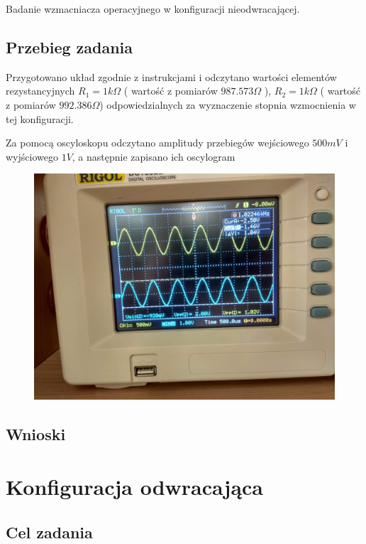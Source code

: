 \documentclass[polish,polish,a4paper]{article}
\begin{document}
\begin{spacing}{1.3}
Badanie wzmacniacza operacyjnego w konfiguracji nieodwracającej.

\subsection{Przebieg zadania}

Przygotowano układ zgodnie z instrukcjami i odczytano wartości elementów rezystancyjnych $R_{1} = 1k\Omega$ ( wartość z pomiarów $987.573\Omega$ ), $R_{2} = 1k\Omega$ ( wartość z pomiarów $992.386\Omega$)  odpowiedzialnych za wyznaczenie stopnia wzmocnienia w tej konfiguracji.

Za pomocą oscyloskopu odczytano amplitudy przebiegów wejściowego $500mV$ i wyjściowego $1V$, a następnie zapisano ich oscylogram

\begin{figure}[H]
	\centering
	\includegraphics[scale=0.1]{131.jpg}
\end{figure}


\subsection{Wnioski}

\section{Konfiguracja odwracająca} %

\subsection{Cel zadania}


\end{spacing}
\end{document}
